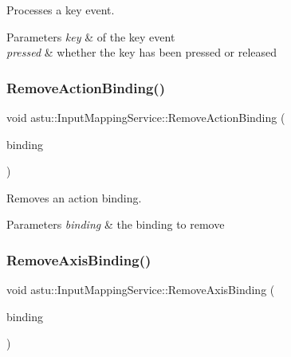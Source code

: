 Processes a key event.


\begin{DoxyParams}{Parameters}
{\em key} & of the key event \\
\hline
{\em pressed} & whether the key has been pressed or released \\
\hline
\end{DoxyParams}
\mbox{\label{classastu_1_1InputMappingService_a9c516a3fc0689d768b87156e599b9bde}} 
\subsubsection{\texorpdfstring{Remove\+Action\+Binding()}{RemoveActionBinding()}}
{\footnotesize\ttfamily void astu\+::\+Input\+Mapping\+Service\+::\+Remove\+Action\+Binding (\begin{DoxyParamCaption}\item[{std\+::shared\+\_\+ptr$<$ \hyperlink{classastu_1_1ActionBinding}{Action\+Binding} $>$}]{binding }\end{DoxyParamCaption})}

Removes an action binding.


\begin{DoxyParams}{Parameters}
{\em binding} & the binding to remove \\
\hline
\end{DoxyParams}
\mbox{\label{classastu_1_1InputMappingService_a453aa6c1e6bc45478d7c988c8a6128f8}} 
\subsubsection{\texorpdfstring{Remove\+Axis\+Binding()}{RemoveAxisBinding()}}
{\footnotesize\ttfamily void astu\+::\+Input\+Mapping\+Service\+::\+Remove\+Axis\+Binding (\begin{DoxyParamCaption}\item[{std\+::shared\+\_\+ptr$<$ \hyperlink{classastu_1_1AxisBinding}{Axis\+Binding} $>$}]{binding }\end{DoxyParamCaption})}

